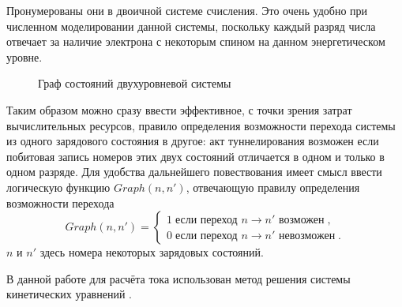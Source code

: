\documentclass[12pt,a4paper]{report}
\begin{document}
Пронумерованы они в двоичной системе счисления. Это очень удобно при численном моделировании данной системы, поскольку каждый разряд числа отвечает за наличие электрона с некоторым спином на данном энергетическом уровне.

\begin{figure}[h]
	\caption{Граф состояний двухуровневой системы}
	\label{fig:level-graph1}
\end{figure}

Таким образом можно сразу ввести эффективное, с точки зрения затрат вычислительных ресурсов, правило определения возможности перехода системы из одного зарядового состояния в другое: акт туннелирования возможен если побитовая запись номеров этих двух состояний отличается в одном и только в одном разряде. Для удобства дальнейшего повествования имеет смысл ввести логическую функцию $Graph(n, n')$, отвечающую правилу определения возможности перехода
\begin{equation}\label{rule}
Graph(n, n') =  \left\{
  \begin{array}{c}
    1\;\mbox{если переход $n \to n'$ возможен}\;,\\
    0\;\mbox{если переход $n \to n'$ невозможен}\;.
  \end{array}
  \right.
\end{equation}
$n$ и $n'$ здесь номера некоторых зарядовых состояний. 

В данной работе для расчёта тока использован метод решения системы кинетических уравнений \cite{kinetic}.
\end{document}
